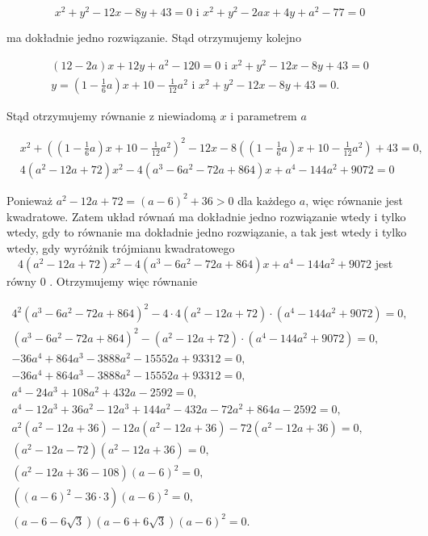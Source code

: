 \documentclass[10pt]{article}
\begin{document}
$$
x^{2}+y^{2}-12 x-8 y+43=0 \text { i } x^{2}+y^{2}-2 a x+4 y+a^{2}-77=0
$$

ma dokładnie jedno rozwiązanie. Stąd otrzymujemy kolejno

$$
\begin{gathered}
(12-2 a) x+12 y+a^{2}-120=0 \text { i } x^{2}+y^{2}-12 x-8 y+43=0 \\
y=\left(1-\frac{1}{6} a\right) x+10-\frac{1}{12} a^{2} \text { i } x^{2}+y^{2}-12 x-8 y+43=0 .
\end{gathered}
$$

Stąd otrzymujemy równanie z niewiadomą $x$ i parametrem $a$

$$
\begin{aligned}
& x^{2}+\left(\left(1-\frac{1}{6} a\right) x+10-\frac{1}{12} a^{2}\right)^{2}-12 x-8\left(\left(1-\frac{1}{6} a\right) x+10-\frac{1}{12} a^{2}\right)+43=0, \\
& 4\left(a^{2}-12 a+72\right) x^{2}-4\left(a^{3}-6 a^{2}-72 a+864\right) x+a^{4}-144 a^{2}+9072=0
\end{aligned}
$$

Ponieważ $a^{2}-12 a+72=(a-6)^{2}+36>0$ dla każdego $a$, więc równanie jest kwadratowe. Zatem układ równań ma dokładnie jedno rozwiązanie wtedy i tylko wtedy, gdy to równanie ma dokładnie jedno rozwiązanie, a tak jest wtedy i tylko wtedy, gdy wyróżnik trójmianu kwadratowego $\quad 4\left(a^{2}-12 a+72\right) x^{2}-4\left(a^{3}-6 a^{2}-72 a+864\right) x+a^{4}-144 a^{2}+9072$ jest równy 0 . Otrzymujemy więc równanie

$$
\begin{gathered}
4^{2}\left(a^{3}-6 a^{2}-72 a+864\right)^{2}-4 \cdot 4\left(a^{2}-12 a+72\right) \cdot\left(a^{4}-144 a^{2}+9072\right)=0, \\
\left(a^{3}-6 a^{2}-72 a+864\right)^{2}-\left(a^{2}-12 a+72\right) \cdot\left(a^{4}-144 a^{2}+9072\right)=0, \\
-36 a^{4}+864 a^{3}-3888 a^{2}-15552 a+93312=0, \\
-36 a^{4}+864 a^{3}-3888 a^{2}-15552 a+93312=0, \\
a^{4}-24 a^{3}+108 a^{2}+432 a-2592=0, \\
a^{4}-12 a^{3}+36 a^{2}-12 a^{3}+144 a^{2}-432 a-72 a^{2}+864 a-2592=0, \\
a^{2}\left(a^{2}-12 a+36\right)-12 a\left(a^{2}-12 a+36\right)-72\left(a^{2}-12 a+36\right)=0, \\
\left(a^{2}-12 a-72\right)\left(a^{2}-12 a+36\right)=0, \\
\left(a^{2}-12 a+36-108\right)(a-6)^{2}=0, \\
\left((a-6)^{2}-36 \cdot 3\right)(a-6)^{2}=0, \\
(a-6-6 \sqrt{3})(a-6+6 \sqrt{3})(a-6)^{2}=0 .
\end{gathered}
$$
\end{document}
